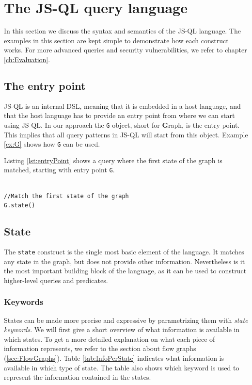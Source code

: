 \section{The JS-QL query language}
\label{sec:Syntax}
 In this section we discuss the syntax and semantics of the JS-QL language. The examples in this section are kept simple to demonstrate how each construct works. For more advanced queries and security vulnerabilities, we refer to chapter \ref{ch:Evaluation}.

\subsection{The entry point}
JS-QL is an internal DSL, meaning that it is embedded in a host language, and that the host language has to provide an entry point from where we can start using JS-QL. In our approach the \texttt{G} object, short for \textbf{G}raph, is the entry point. This implies that all query patterns in JS-QL will start from this object. Example \ref{ex:G} shows how \texttt{G} can be used.

\begin{exmp}
\label{ex:G}
Listing \ref{lst:entryPoint} shows a query where the first state of the graph is matched, starting with entry point \texttt{G}.

\begin{lstlisting}[label={lst:entryPoint},language=JSQL,caption=Matching the first state starting from entry point \texttt{G},mathescape=true]  % float=t?

//Match the first state of the graph
G.state()
\end{lstlisting}
\end{exmp}

\subsection{State}
The \texttt{state} construct is the single most basic element of the language. It matches any state in the graph, but does not provide other information. Nevertheless is it the most important building block of the language, as it can be used to construct higher-level queries and predicates. 

\subsubsection*{Keywords}
States can be made more precise and expressive by parametrizing them with \textit{state keywords}. We will first give a short overview of what information is available in which states. To get a more detailed explanation on what each piece of information represents, we refer to the section about flow graphs (\ref{sec:FlowGraphs}). Table \ref{tab:InfoPerState} indicates what information is available in which type of state. The table also shows which keyword is used to represent the information contained in the states.

